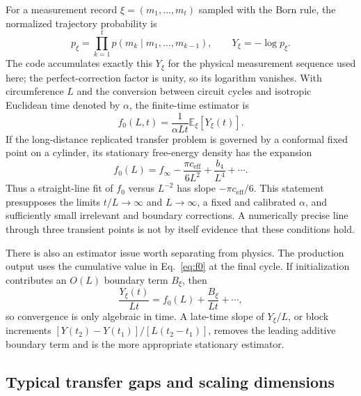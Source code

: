 \documentclass[aps,prb,onecolumn,nofootinbib,superscriptaddress]{revtex4-2}
\newcommand{\E}{\mathbb{E}}
\begin{document}
For a measurement record $\xi=(m_1,\ldots,m_t)$ sampled with the Born rule, the normalized
trajectory probability is
\begin{equation}
 p_\xi=\prod_{k=1}^{t}p(m_k\mid m_1,\ldots,m_{k-1}),
 \qquad Y_\xi=-\log p_\xi.
\end{equation}
The code accumulates exactly this $Y_\xi$ for the physical measurement sequence used here;
the perfect-correction factor is unity, so its logarithm vanishes.  With circumference $L$
and the conversion between circuit cycles and isotropic Euclidean time denoted by $\alpha$,
the finite-time estimator is
\begin{equation}
 f_0(L,t)=\frac{1}{\alpha L t}\E_\xi[Y_\xi(t)].
 \label{eq:f0}
\end{equation}
If the long-distance replicated transfer problem is governed by a conformal fixed point on
a cylinder, its stationary free-energy density has the expansion
\begin{equation}
 f_0(L)=f_\infty-\frac{\pi c_{\mathrm{eff}}}{6L^2}
 +\frac{b_4}{L^4}+\cdots .
 \label{eq:ceff}
\end{equation}
Thus a straight-line fit of $f_0$ versus $L^{-2}$ has slope
$-\pi c_{\mathrm{eff}}/6$.  This statement presupposes the limits $t/L\to\infty$ and
$L\to\infty$, a fixed and calibrated $\alpha$, and sufficiently small irrelevant and
boundary corrections.  A numerically precise line through three transient points is not by
itself evidence that these conditions hold.

There is also an estimator issue worth separating from physics.  The production output uses
the cumulative value in Eq.~\eqref{eq:f0} at the final cycle.  If initialization contributes
an $O(L)$ boundary term $B_\xi$, then
\begin{equation}
 \frac{Y_\xi(t)}{Lt}=f_0(L)+\frac{B_\xi}{Lt}+\cdots,
\end{equation}
so convergence is only algebraic in time.  A late-time slope of $Y_\xi/L$, or block
increments $[Y(t_2)-Y(t_1)]/[L(t_2-t_1)]$, removes the leading additive boundary term and is
the more appropriate stationary estimator.

\subsection{Typical transfer gaps and scaling dimensions}
\end{document}
